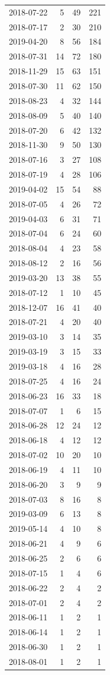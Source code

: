 \begin{tabular}{lrrr}
2018-07-22 & 5 & 49 & 221 \\
2018-07-17 & 2 & 30 & 210 \\
2019-04-20 & 8 & 56 & 184 \\
2018-07-31 & 14 & 72 & 180 \\
2018-11-29 & 15 & 63 & 151 \\
2018-07-30 & 11 & 62 & 150 \\
2018-08-23 & 4 & 32 & 144 \\
2018-08-09 & 5 & 40 & 140 \\
2018-07-20 & 6 & 42 & 132 \\
2018-11-30 & 9 & 50 & 130 \\
2018-07-16 & 3 & 27 & 108 \\
2018-07-19 & 4 & 28 & 106 \\
2019-04-02 & 15 & 54 & 88 \\
2018-07-05 & 4 & 26 & 72 \\
2019-04-03 & 6 & 31 & 71 \\
2018-07-04 & 6 & 24 & 60 \\
2018-08-04 & 4 & 23 & 58 \\
2018-08-12 & 2 & 16 & 56 \\
2019-03-20 & 13 & 38 & 55 \\
2018-07-12 & 1 & 10 & 45 \\
2018-12-07 & 16 & 41 & 40 \\
2018-07-21 & 4 & 20 & 40 \\
2019-03-10 & 3 & 14 & 35 \\
2019-03-19 & 3 & 15 & 33 \\
2019-03-18 & 4 & 16 & 28 \\
2018-07-25 & 4 & 16 & 24 \\
2018-06-23 & 16 & 33 & 18 \\
2018-07-07 & 1 & 6 & 15 \\
2018-06-28 & 12 & 24 & 12 \\
2018-06-18 & 4 & 12 & 12 \\
2018-07-02 & 10 & 20 & 10 \\
2018-06-19 & 4 & 11 & 10 \\
2018-06-20 & 3 & 9 & 9 \\
2018-07-03 & 8 & 16 & 8 \\
2019-03-09 & 6 & 13 & 8 \\
2019-05-14 & 4 & 10 & 8 \\
2018-06-21 & 4 & 9 & 6 \\
2018-06-25 & 2 & 6 & 6 \\
2018-07-15 & 1 & 4 & 6 \\
2018-06-22 & 2 & 4 & 2 \\
2018-07-01 & 2 & 4 & 2 \\
2018-06-11 & 1 & 2 & 1 \\
2018-06-14 & 1 & 2 & 1 \\
2018-06-30 & 1 & 2 & 1 \\
2018-08-01 & 1 & 2 & 1 \\
\bottomrule
\end{tabular}
